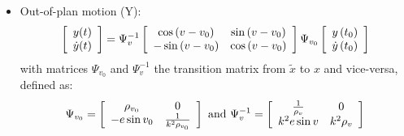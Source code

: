 \begin{itemize}
	\item Out-of-plan motion (Y):
	\begin{equation} \label{eq:ya_y}
		\left[ \begin{array} { c } { y ( t ) } \\ { \dot { y } ( t ) } \end{array} \right] = \Psi _ { v } ^ { - 1 } \left[ \begin{array} { c c } { \cos \left( v - v _ { 0 } \right) } & { \sin \left( v - v _ { 0 } \right) } \\ { - \sin \left( v - v _ { 0 } \right) } & { \cos \left( v - v _ { 0 } \right) } \end{array} \right] \Psi _ { v _ { 0 } } \left[ \begin{array} { c } { y \left( t _ { 0 } \right) } \\ { \dot { y } \left( t _ { 0 } \right) } \end{array} \right]
	\end{equation}{}
	with matrices $\Psi _ { v _ { 0 } }$ and $\Psi _ { v } ^ { - 1 }$ the transition matrix from $\tilde{x}$ to $x$ and vice-versa, defined as:
	\begin{equation}\label{eq:ya_matric}
		\Psi _ { v _ { 0 } } = \left[ \begin{array} { c c } { \rho _ { v _ { 0 } } } & { 0 } \\ { - e \sin v _ { 0 } } & { \frac { 1 } { k ^ { 2 } \rho _ { v _ { 0 } } } } \end{array} \right]
		\text{ and }
		\Psi _ { v } ^ { - 1 } = \left[ \begin{array} { c c } { \frac { 1 } { \rho _ { v } } } & { 0 } \\ { k ^ { 2 } e \sin v } & { k ^ { 2 } \rho _ { v } } \end{array} \right]
	\end{equation}{}
	

\end{itemize}
